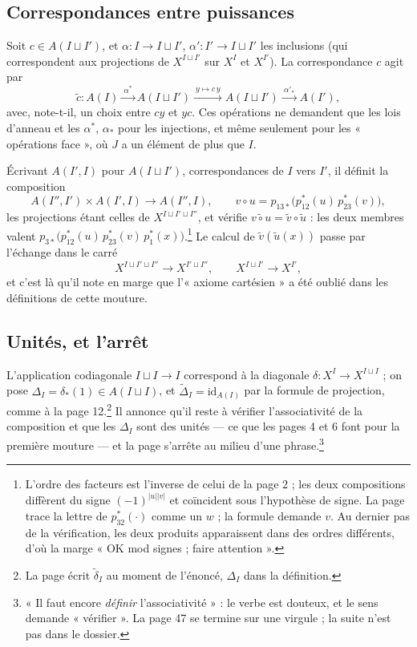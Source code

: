 \documentclass[11pt,a4paper]{article}
\begin{document}
\subsection*{Correspondances entre puissances}

Soit $c \in A(I \sqcup I')$, et $\alpha \colon I \to I \sqcup I'$,
$\alpha' \colon I' \to I \sqcup I'$ les inclusions (qui correspondent aux
projections de $X^{I \sqcup I'}$ sur $X^{I}$ et $X^{I'}$). La correspondance
$c$ agit par
\[ \tilde{c} \colon A(I) \xrightarrow{\ \alpha^{*}\ } A(I \sqcup I') \xrightarrow{\ y \mapsto c\,y\ } A(I \sqcup I') \xrightarrow{\ \alpha'_{*}\ } A(I') , \]
avec, note-t-il, un choix entre $cy$ et $yc$. Ces opérations ne demandent que
les lois d'anneau et les $\alpha^{*}$, $\alpha_{*}$ pour les injections, et même
seulement pour les « opérations face », où $J$ a un élément de plus que $I$.

Écrivant $A(I', I)$ pour $A(I \sqcup I')$, correspondances de $I$ vers $I'$, il
définit la composition
\[ A(I'', I') \times A(I', I) \to A(I'', I) , \qquad v \circ u = p_{13*}\bigl(p_{12}^{*}(u)\, p_{23}^{*}(v)\bigr) , \]
les projections étant celles de $X^{I \sqcup I' \sqcup I''}$, et vérifie
$\widetilde{v \circ u} = \tilde{v} \circ \tilde{u}$ : les deux membres valent
$p_{3*}\bigl(p_{12}^{*}(u)\, p_{23}^{*}(v)\, p_{1}^{*}(x)\bigr)$.\footnote{L'ordre
des facteurs est l'inverse de celui de la page 2 ; les deux compositions
diffèrent du signe $(-1)^{|u||v|}$ et coïncident sous l'hypothèse de signe. La
page trace la lettre de $p_{32}^{*}(\cdot)$ comme un $w$ ; la formule demande
$v$. Au dernier pas de la vérification, les deux produits apparaissent dans
des ordres différents, d'où la marge « OK mod signes ; faire attention ».}
Le calcul de $\tilde{v}(\tilde{u}(x))$ passe par l'échange dans le carré
\[ X^{I \sqcup I' \sqcup I''} \to X^{I' \sqcup I''} , \qquad X^{I \sqcup I'} \to X^{I'} , \]
et c'est là qu'il note en marge que l'« axiome cartésien » a été oublié dans
les définitions de cette mouture.

\subsection*{Unités, et l'arrêt}

L'application codiagonale $I \sqcup I \to I$ correspond à la diagonale
$\delta \colon X^{I} \to X^{I \sqcup I}$ ; on pose
$\Delta_{I} = \delta_{*}(1) \in A(I \sqcup I)$, et
$\tilde{\Delta}_{I} = \mathrm{id}_{A(I)}$ par la formule de projection, comme
à la page 12.\footnote{La page écrit $\tilde{\delta}_{I}$ au moment de
l'énoncé, $\Delta_{I}$ dans la définition.} Il annonce qu'il reste à vérifier
l'associativité de la composition et que les $\Delta_{I}$ sont des unités ---
ce que les pages 4 et 6 font pour la première mouture --- et la page
s'arrête au milieu d'une phrase.\footnote{« Il faut encore \emph{définir}
l'associativité » : le verbe est douteux, et le sens demande
« vérifier ». La page 47 se termine sur une virgule ; la suite n'est pas dans
le dossier.}
\end{document}
